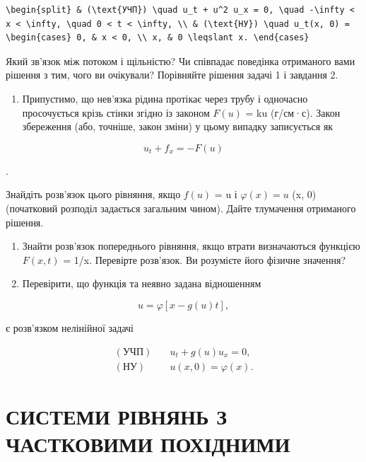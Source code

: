 \documentclass[
  ukrainian,
]{article}
\providecommand{\tightlist}{%
  \setlength{\itemsep}{0pt}\setlength{\parskip}{0pt}}
\begin{document}
\begin{verbatim}
\begin{split} & (\text{УЧП}) \quad u_t + u^2 u_x = 0, \quad -\infty < x < \infty, \quad 0 < t < \infty, \\ & (\text{НУ}) \quad u_t(x, 0) = \begin{cases} 0, & x < 0, \\ x, & 0 \leqslant x. \end{cases}
\end{verbatim}

Який зв'язок між потоком і щільністю? Чи співпадає поведінка отриманого
вами рішення з тим, чого ви очікували? Порівняйте рішення задачі 1 і
завдання 2.

\begin{enumerate}
\def\labelenumi{\arabic{enumi}.}
\setcounter{enumi}{2}
\tightlist
\item
  Припустимо, що нев'язка рідина протікає через трубу і одночасно
  просочується крізь стінки згідно із законом \(F(u)\) = ku (г/см·с).
  Закон збереження (або, точніше, закон зміни) у цьому випадку
  записується як
\end{enumerate}

\[
u_t + f_x = -F(u)
\]

.

Знайдіть розв'язок цього рівняння, якщо \(f(u)\) = u і
\(\varphi(x) = u\) (x, 0) (початковий розподіл задається загальним
чином). Дайте тлумачення отриманого рішення.

\begin{enumerate}
\def\labelenumi{\arabic{enumi}.}
\setcounter{enumi}{3}
\item
  Знайти розв'язок попереднього рівняння, якщо втрати визначаються
  функцією \(F(x, t)\) = 1/x. Перевірте розв'язок. Ви розумієте його
  фізичне значення?
\item
  Перевірити, що функція та неявно задана відношенням
\end{enumerate}

\[
u = \varphi[x - g(u) t],
\]

є розв'язком нелінійної задачі

\[
\begin{aligned}
(\text{УЧП})\quad & u_t + g(u)u_x = 0, \\
(\text{НУ})\quad & u(x,0) = \varphi(x).
\end{aligned}
\]

\section{СИСТЕМИ РІВНЯНЬ З ЧАСТКОВИМИ
ПОХІДНИМИ}\label{ux441ux438ux441ux442ux435ux43cux438-ux440ux456ux432ux43dux44fux43dux44c-ux437-ux447ux430ux441ux442ux43aux43eux432ux438ux43cux438-ux43fux43eux445ux456ux434ux43dux438ux43cux438}
\end{document}
